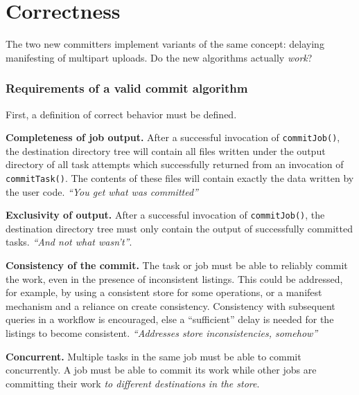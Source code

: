 \documentclass[conference]{IEEEtran}
\begin{document}
\section{Correctness}
\label{sec:correctness}

The two new committers implement variants of the same concept: delaying
manifesting of multipart uploads.
Do the new algorithms actually \emph{work}?


\subsubsection{Requirements of a valid commit algorithm}

First, a definition of correct behavior must be defined.

\begin{paragraph}
  \textbf{Completeness of job output.}
  After a successful invocation of \texttt{commitJob()},
  the destination directory tree will contain all files written under the output directory
  of all task attempts which successfully returned from an invocation of \texttt{commitTask()}.
  The contents of these files will contain exactly the data written by the user code.
  \emph{``You get what was committed''}
\end{paragraph}

\begin{paragraph}
  \textbf{Exclusivity of output.}
  After a successful invocation of \texttt{commitJob()},
  the destination directory tree must only contain the output of successfully
  committed tasks.
  \emph{``And not what wasn't''}.
\end{paragraph}

\begin{paragraph}
  \textbf{Consistency of the commit.}
  The task or job must be able to reliably commit the work, even in the presence
  of inconsistent listings.
  This could be addressed, for example, by using a consistent store for some operations,
  or a manifest mechanism and a reliance on create consistency.
  Consistency with subsequent queries in a workflow is encouraged, else a ``sufficient''
  delay is needed for the listings to become consistent.
  \emph{``Addresses store inconsistencies, somehow''}
\end{paragraph}

\begin{paragraph}
  \textbf{Concurrent.}
  Multiple tasks in the same job must be able to commit concurrently.
  A job must be able to commit its work while other jobs are committing
  their work \emph{to different destinations in the store}.
\end{paragraph}
\end{document}
